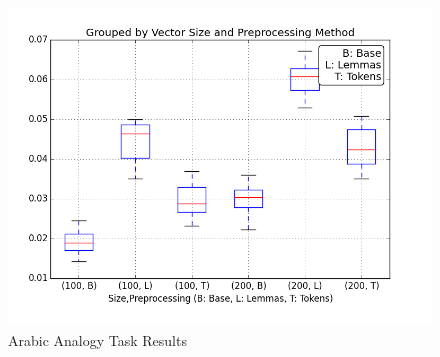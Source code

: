 \begin{figure}
  \includegraphics[width=\linewidth]{results_analogy/ar_analogy_results_fixed_plot.png}
  \caption{Arabic Analogy Task Results}
  \label{fig:aranalogy}
\end{figure}















